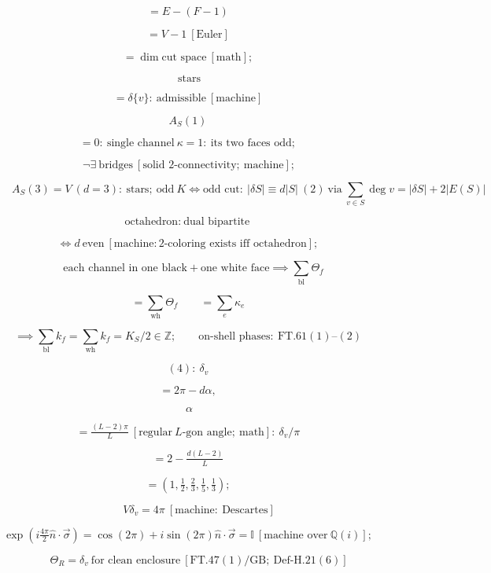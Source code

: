 \begin{theorem}
\[
= E-(F-1)
\]

\[
= V-1\ [\text{Euler}]
\]

\[
= \dim\text{cut space}\ [\text{math}];
\]

\[
\ \text{stars}
\]

\[
= \delta\{v\}:\ \text{admissible}\ [\text{machine}]
\]

\[
A_S(1)
\]

\[
= 0:\ \text{single channel}\ \kappa{=}1:\ \text{its two faces odd};
\]

\[
\ \neg\exists\ \text{bridges}\ [\text{solid 2-connectivity};\ \text{machine}];
\]

\[
\qquad A_S(3)=V\ (d{=}3):\ \text{stars};\ \text{odd}\ K\iff\text{odd cut}:\ |\delta S|\equiv d|S|\ (2)\ \text{via}\ \textstyle\sum_{v\in S}\deg v=|\delta S|+2|E(S)|
\]

\[
\text{octahedron}:\ \text{dual bipartite}
\]

\[
\iff d\ \text{even}\ [\text{machine}: 2\text{-coloring exists iff octahedron}];
\]

\[
\quad\text{each channel in one black} + \text{one white face}\implies\textstyle\sum_{\mathrm{bl}}\Theta_f
\]

\[
= \sum_{\mathrm{wh}}\Theta_f\qquad = \sum_e\kappa_e
\]

\[
\implies\textstyle\sum_{\mathrm{bl}}k_f=\sum_{\mathrm{wh}}k_f=K_S/2\in\mathbb Z;\qquad\text{on-shell phases}:\ \mathrm{FT.61}(1)\text{--}(2)
\]

\[
(4):\ \delta_v
\]

\[
= 2\pi-d\alpha,
\]

\[
\ \alpha
\]

\[
= \tfrac{(L-2)\pi}L\ [\text{regular}\ L\text{-gon angle};\ \text{math}]:\ \delta_v/\pi
\]

\[
= 2-\tfrac{d(L-2)}L
\]

\[
= (1,\tfrac12,\tfrac23,\tfrac15,\tfrac13);
\]

\[
\qquad V\delta_v=4\pi\ [\text{machine}:\ \text{Descartes}]
\]

\[
\exp(i\tfrac{4\pi}2\hat n\cdot\vec\sigma)=\cos(2\pi)+i\sin(2\pi)\hat n\cdot\vec\sigma=\mathbb I\ [\text{machine over}\ \mathbb Q(i)];
\]

\[
\qquad \Theta_R=\delta_v\ \text{for clean enclosure}\ [\mathrm{FT.47}(1)/\mathrm{GB};\ \mathrm{Def\text{-}H.21}(6)]
\]


\end{theorem}
